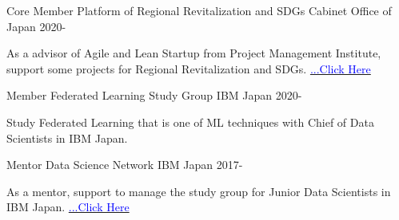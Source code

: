 

\begin{cventries}

  \cventry
    {Core Member} %
    {Platform of Regional Revitalization and SDGs} %
    {Cabinet Office of Japan} %
    {2020-} %
    {
      \begin{cvitems} %
        \item {As a advisor of Agile and Lean Startup from Project Management Institute, support some projects for Regional Revitalization and SDGs. \href{http://future-city.jp/platform/}{\textcolor{blue}{...Click Here}}}
      \end{cvitems}
    }

\cventry
    {Member} %
    {Federated Learning Study Group} %
    {IBM Japan} %
    {2020-} %
    {
      \begin{cvitems} %
        \item {Study Federated Learning that is one of ML techniques with Chief of Data Scientists in IBM Japan.}
      \end{cvitems}
    }


\cventry
    {Mentor} %
    {Data Science Network} %
    {IBM Japan} %
    {2017-} %
    {
      \begin{cvitems} %
        \item {As a mentor, support to manage the study group for Junior Data Scientists in IBM Japan. \href{https://www.ibm.com/blogs/solutions/jp-ja/datascience_and_ai_dsn/}{\textcolor{blue}{...Click Here}}}
      \end{cvitems}
    }

  
\end{cventries}
